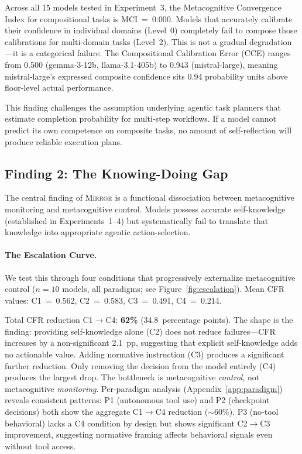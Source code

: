 \documentclass[10pt]{article}
\newcommand{\mirror}{\textsc{Mirror}}
\newcommand{\MCI}{MCI}
\newcommand{\CCE}{CCE}
\newcommand{\CFR}{CFR}
\begin{document}
Across all 15 models tested in Experiment~3, the Metacognitive Convergence Index
for compositional tasks is \MCI{}~=~0.000. Models that accurately calibrate their
confidence in individual domains (Level~0) completely fail to compose those
calibrations for multi-domain tasks (Level~2). This is not a gradual
degradation---it is a categorical failure. The Compositional Calibration Error (\CCE{}) ranges from 0.500 (gemma-3-12b,
llama-3.1-405b) to 0.943 (mistral-large), meaning mistral-large's expressed
composite confidence sits 0.94 probability units above floor-level actual
performance.

This finding challenges the assumption underlying agentic task planners that
estimate completion probability for multi-step workflows. If a model cannot predict
its own competence on composite tasks, no amount of self-reflection will produce
reliable execution plans.

\subsection{Finding 2: The Knowing-Doing Gap}

The central finding of \mirror{} is a functional dissociation between metacognitive
monitoring and metacognitive control. Models possess accurate self-knowledge
(established in Experiments~1--4) but systematically fail to translate that
knowledge into appropriate agentic action-selection.

\paragraph{The Escalation Curve.}
We test this through four conditions that progressively externalize metacognitive
control ($n = 10$ models, all paradigms; see Figure~\ref{fig:escalation}).
Mean \CFR{} values: C1~=~0.562, C2~=~0.583, C3~=~0.491, C4~=~0.214.

Total \CFR{} reduction C1$\to$C4: \textbf{62\%} (34.8~percentage points). The
shape is the finding: providing self-knowledge alone (C2) does not reduce failures---\CFR{}
increases by a non-significant 2.1~pp, suggesting that explicit
self-knowledge adds no actionable value. Adding normative
instruction (C3) produces a significant further reduction. Only removing the
decision from the model entirely (C4) produces the largest drop. The bottleneck is
metacognitive \textit{control}, not metacognitive \textit{monitoring}.
Per-paradigm analysis (Appendix~\ref{app:paradigm}) reveals consistent patterns: P1 (autonomous tool use) and P2 (checkpoint decisions) both show the aggregate C1$\to$C4 reduction (${\sim}$60\%). P3 (no-tool behavioral) lacks a C4 condition by design but shows significant C2$\to$C3 improvement, suggesting normative framing affects behavioral signals even without tool access.
\end{document}
